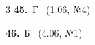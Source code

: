 \documentclass[12pt]{article}
\begin{document}
\ifshowsolutions
{}
\begin{multicols}{3}\noindent
\noindent\textbf{45.}~Г \ {\scriptsize\color{gray}(1.06, №4)}\par
\noindent\textbf{46.}~Б \ {\scriptsize\color{gray}(4.06, №1)}\par
\end{multicols}
\fi

\endgroup
\end{document}

